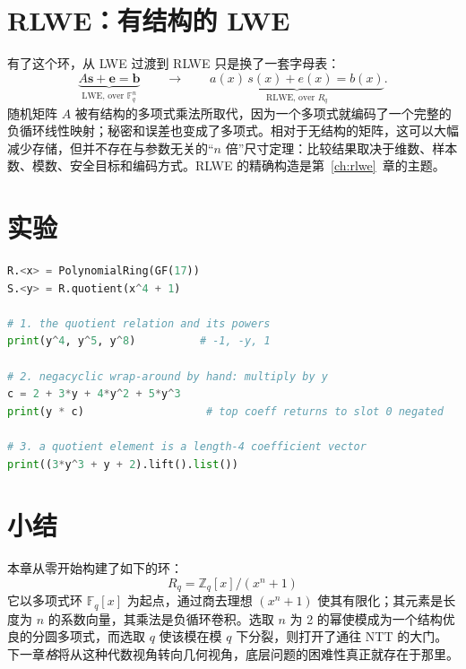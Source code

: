 \section{RLWE：有结构的 LWE}
有了这个环，从 LWE 过渡到 RLWE 只是换了一套字母表：
\[
\underbrace{A\mathbf{s}+\mathbf{e}=\mathbf{b}}_{\text{LWE, over } \mathbb{F}_q^n}
\qquad\longrightarrow\qquad
\underbrace{a(x)\,s(x)+e(x)=b(x)}_{\text{RLWE, over } R_q}.
\]
随机矩阵 $A$ 被有结构的多项式乘法所取代，因为一个多项式就编码了一个完整的负循环线性映射；秘密和误差也变成了多项式。相对于无结构的矩阵，这可以大幅减少存储，但并不存在与参数无关的“$n$ 倍”尺寸定理：比较结果取决于维数、样本数、模数、安全目标和编码方式。RLWE 的精确构造是第~\ref{ch:rlwe}~章的主题。

\section{实验}

\begin{lstlisting}[language=Python]
R.<x> = PolynomialRing(GF(17))
S.<y> = R.quotient(x^4 + 1)

# 1. the quotient relation and its powers
print(y^4, y^5, y^8)          # -1, -y, 1

# 2. negacyclic wrap-around by hand: multiply by y
c = 2 + 3*y + 4*y^2 + 5*y^3
print(y * c)                   # top coeff returns to slot 0 negated

# 3. a quotient element is a length-4 coefficient vector
print((3*y^3 + y + 2).lift().list())
\end{lstlisting}

\section{小结}
本章从零开始构建了如下的环：
\[
R_q = \mathbb{Z}_q[x]/(x^n+1)
\]
它以多项式环 $\mathbb{F}_q[x]$ 为起点，通过商去理想 $(x^n+1)$ 使其有限化；其元素是长度为 $n$ 的系数向量，其乘法是负循环卷积。选取 $n$ 为 2 的幂使模成为一个结构优良的分圆多项式，而选取 $q$ 使该模在模 $q$ 下分裂，则打开了通往 NTT 的大门。下一章\emph{格}将从这种代数视角转向几何视角，底层问题的困难性真正就存在于那里。

\printbibliography[heading=chapterrefs]

